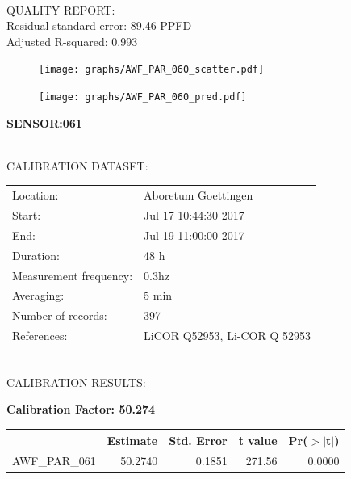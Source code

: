 \documentclass[oneside]{report}
\begin{document}
\hrulefill\\
QUALITY REPORT:\\
Residual standard error: 89.46 PPFD\\
Adjusted R-squared: 0.993



\begin{figure}[H]
  \centering
  \texttt{[image: graphs/AWF\_PAR\_060\_scatter.pdf]}
\end{figure}




\begin{figure}[H]
  \centering
  \texttt{[image: graphs/AWF\_PAR\_060\_pred.pdf]}
\end{figure}

\pagebreak


\begin{center}
\large{\textbf{SENSOR:061}}\\
\end{center}

\hrulefill\\
CALIBRATION DATASET:\\
\begin{table}[h!]
  \centering
  \label{tab:table1}
  \begin{tabular}{ll}
    Location: & Aboretum Goettingen\\ 
    
    
    Start:  & Jul 17 10:44:30 2017 \\
    End:   & Jul 19 11:00:00 2017\\ 
    Duration: & 48 h\\
    Measurement frequency: & 0.3hz\\
    Averaging:  &5 min\\
    Number of records: & 397 \\
    References: & LiCOR Q52953, Li-COR Q 52953 \\
  \end{tabular}
\end{table}

\hrulefill\\
CALIBRATION RESULTS:\\


\begin{center}
\textbf{\large{Calibration Factor: 50.274}}\\
\end{center}
\begin{table}[ht]
\centering
\begin{tabular}{rrrrr}
  \hline
 & Estimate & Std. Error & t value & Pr($>$$|$t$|$) \\ 
  \hline
AWF\_PAR\_061 & 50.2740 & 0.1851 & 271.56 & 0.0000 \\ 
   \hline
\end{tabular}
\end{table}
\end{document}
